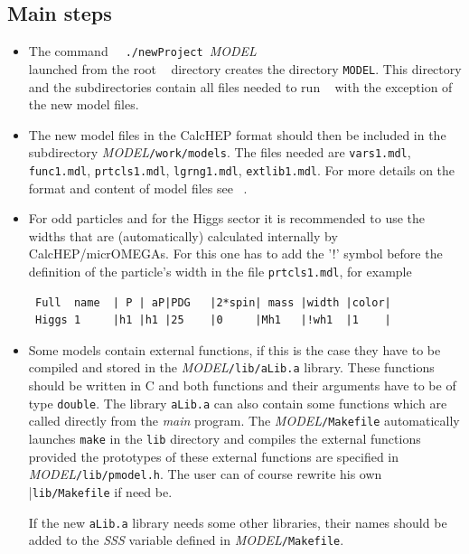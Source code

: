 \documentclass[12pt,a4paper]{article}
\begin{document}
\subsection{Main steps}
\begin{itemize}
\item
The command
\verb|  ./newProject |{\it MODEL}\\
launched from the root \micro~ directory  creates the directory 
\verb|MODEL|. This directory and the subdirectories contain all files needed to run \micro~ with the
exception of the new model files. 

\item
The new model files in the CalcHEP format should then be included in the
 subdirectory {\it MODEL}\verb|/work/models|.  The files needed are
\verb|vars1.mdl|,  \verb|func1.mdl|,  \verb|prtcls1.mdl|, \verb|lgrng1.mdl|,
\verb|extlib1.mdl|. For more details on the format and content of model files see
~\cite{Pukhov:2004ca}.

\item
For odd particles and for the Higgs sector it is recommended to use the widths that are (automatically) calculated internally by 
CalcHEP/micrOMEGAs. 
For this  one has to add the '!' symbol before  
the definition of the particle's width  in  the file \verb|prtcls1.mdl|, for example
\begin{verbatim}
 Full  name  | P | aP|PDG   |2*spin| mass |width |color|  
 Higgs 1     |h1 |h1 |25    |0     |Mh1   |!wh1  |1    |
\end{verbatim}


\item
Some models contain  external functions, if this is the case  they have to be 
compiled and stored in the {\it MODEL}\verb|/lib/aLib.a| library. 
These functions should be written in C and both functions and their arguments have to be 
of type \verb|double|. The library \verb|aLib.a| 
can also contain some functions which are called directly from the 
{\it main} program. The {\it MODEL}\verb|/Makefile| automatically launches
\verb|make| in the \verb|lib| directory and compiles the external functions provided
the prototypes of these external 
functions are specified in  {\it MODEL}\verb|/lib/pmodel.h|. 
The user can of course rewrite 
his own  |\verb|lib/Makefile| if need be.

If the new \verb|aLib.a| library needs some other libraries, their
names should be added to the {\it SSS} variable defined in {\it MODEL}\verb|/Makefile|.
\end{itemize}
\end{document}
